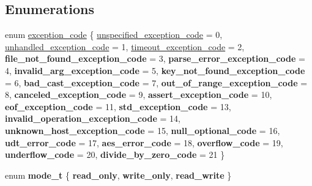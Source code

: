 \subsection*{Enumerations}
\begin{DoxyCompactItemize}
\item 
enum \mbox{\hyperlink{namespacefc_ab52b42f18c442a260897c74c66c3d35c}{exception\+\_\+code}} \{ \newline
\mbox{\hyperlink{namespacefc_ab52b42f18c442a260897c74c66c3d35ca54c3c8b9caa13270a23c57af7bf9c52c}{unspecified\+\_\+exception\+\_\+code}} = 0, 
\mbox{\hyperlink{namespacefc_ab52b42f18c442a260897c74c66c3d35ca10adcbd9bf1986da4c289d2f0210cd85}{unhandled\+\_\+exception\+\_\+code}} = 1, 
\mbox{\hyperlink{namespacefc_ab52b42f18c442a260897c74c66c3d35ca0269f214acef1ad4c7531974bc011893}{timeout\+\_\+exception\+\_\+code}} = 2, 
{\bfseries file\+\_\+not\+\_\+found\+\_\+exception\+\_\+code} = 3, 
\newline
{\bfseries parse\+\_\+error\+\_\+exception\+\_\+code} = 4, 
{\bfseries invalid\+\_\+arg\+\_\+exception\+\_\+code} = 5, 
{\bfseries key\+\_\+not\+\_\+found\+\_\+exception\+\_\+code} = 6, 
{\bfseries bad\+\_\+cast\+\_\+exception\+\_\+code} = 7, 
\newline
{\bfseries out\+\_\+of\+\_\+range\+\_\+exception\+\_\+code} = 8, 
{\bfseries canceled\+\_\+exception\+\_\+code} = 9, 
{\bfseries assert\+\_\+exception\+\_\+code} = 10, 
{\bfseries eof\+\_\+exception\+\_\+code} = 11, 
\newline
{\bfseries std\+\_\+exception\+\_\+code} = 13, 
{\bfseries invalid\+\_\+operation\+\_\+exception\+\_\+code} = 14, 
{\bfseries unknown\+\_\+host\+\_\+exception\+\_\+code} = 15, 
{\bfseries null\+\_\+optional\+\_\+code} = 16, 
\newline
{\bfseries udt\+\_\+error\+\_\+code} = 17, 
{\bfseries aes\+\_\+error\+\_\+code} = 18, 
{\bfseries overflow\+\_\+code} = 19, 
{\bfseries underflow\+\_\+code} = 20, 
\newline
{\bfseries divide\+\_\+by\+\_\+zero\+\_\+code} = 21
 \}
\item 
\mbox{\label{namespacefc_a3d8a2be677709cc41f09aa7925f2d55f}} 
enum {\bfseries mode\+\_\+t} \{ {\bfseries read\+\_\+only}, 
{\bfseries write\+\_\+only}, 
{\bfseries read\+\_\+write}
 \}
\end{DoxyCompactItemize}
